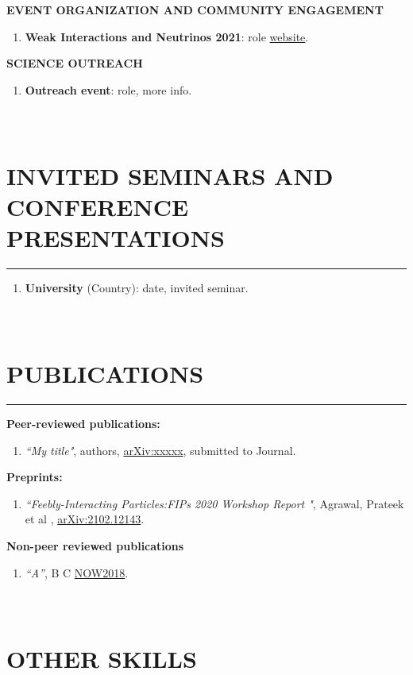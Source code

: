 \documentclass[a4paper,10pt]{article}
\newcommand{\subheader}[1]{\textcolor{linkcolour}{\footnotesize\textbf{#1}}}
\begin{document}
\subheader{EVENT ORGANIZATION AND COMMUNITY ENGAGEMENT}
\begin{enumerate}[label={\tiny$\bullet$}]

\item \textbf{Weak Interactions and Neutrinos 2021}: role \href{address}{website}.

\end{enumerate}

\subheader{SCIENCE OUTREACH}
\begin{enumerate}[label={\tiny$\bullet$}]


\item \textbf{Outreach event}: role, more info.

\end{enumerate}



\section{\\ INVITED SEMINARS AND CONFERENCE PRESENTATIONS}
\vspace{-3ex}\noindent\rule{\textwidth}{0.7pt}

\begin{enumerate}

\item \textbf{University} (Country): date, invited seminar.
\end{enumerate}

\section{\\PUBLICATIONS}
\vspace{-3ex}\noindent\rule{\textwidth}{0.7pt}

{\textbf{Peer-reviewed publications:}}
\begin{enumerate}
    \item \textit{``My title"}, authors, \href{address}{arXiv:xxxxx}, submitted to Journal.

\end{enumerate}

{ \textbf{Preprints:}}
\begin{enumerate}
\item \textit{``Feebly-Interacting Particles:FIPs 2020 Workshop Report
"}, Agrawal, Prateek et al , \href{https://arxiv.org/abs/2102.12143}{arXiv:2102.12143}.
\end{enumerate}

\vspace{1ex}

{\textbf{Non-peer reviewed publications}}
 \begin{enumerate}
 
  \item \textit{``A''}, B C \href{address}{NOW2018}.

\end{enumerate}

\vspace{1ex}



\section{\\OTHER SKILLS}
\end{document}
